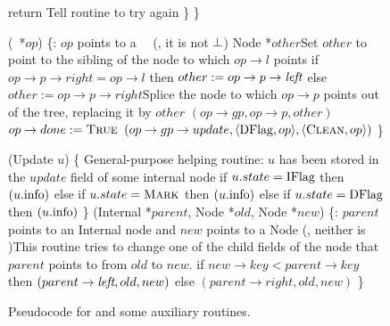 \begin{figure*}
\begin{code}
		return \FALSE\tabtabcom Tell  routine to try again\nlc
		\p       \}\nlc
		\p
		\}\bl
		\nlc
		
		(\DFlag\ *$op$) \{\ul
		\n   {}:  $op$ points to a \DFlag\ \record\  (\ie, it is not $\mbox{$\bot$}$)\nlc
		Node *$other$\bl\ul
		\com Set $other$ to point to the sibling of the node to which  $op\rightarrow l$ points \nlc
		if $op\rightarrow p\rightarrow right = op\rightarrow l$ then $other := op\rightarrow p \rightarrow \mbox{\it left}$ else $other:=op\rightarrow p\rightarrow right$\label{read-other}\ul 
		\com Splice the node to which $op\rightarrow p$ points out of the tree, replacing it by $other$\nlc
		$(op\rightarrow gp, op\rightarrow p, other)$ \label{dchild-cas}\nlc
		\textcolor{blue}{$op \rightarrow done := \mbox{\sc True}$}  \nlc
		\CASB$(op\rightarrow gp\rightarrow update, \langle \mbox{DFlag}, op\rangle, \langle \mbox{\sc Clean}, op\rangle)$ \label{dunflag-cas}\nlc
		\p
		\}\bl\nlc
		
		(Update $u$) \{ \tabtabcom General-purpose helping routine\ul
		\n    {}:  $u$ has been stored in the $update$ field of some internal node\nlc
		if $u.state = \mbox{IFlag}$ then $(u.\mbox{info})$\label{call-HelpInsert}\nlc
		else if $u.state = \mbox{\sc Mark}$ then $(u.\mbox{info})$\label{call-hm2}\nlc
		else if $u.state = \mbox{DFlag}$ then $(u.\mbox{info})$\label{call-HelpDelete}\nlc
		\p
		\}\bl
		\nlc
		(Internal *$parent$, Node *$old$, Node *$new$) \{\label{CAS-Child}\ul
		\n  {}:  $parent$ points to an Internal node and $new$ points to a Node (\ie, neither is \NULL)\ul
		\com This routine tries to change one of the child fields of the node that $parent$ points to from $old$ to $new$.\nlc
		if $new \rightarrow key < parent\rightarrow key$ then\label{which-child}\nlc
		\n       \CASB$(parent\rightarrow \mbox{\it left}, old, new)$\label{child-cas-1}\nlc
		\p  else\nlc
		\n       \CASB$(parent\rightarrow right, old, new)$\label{child-cas-2}\nlc
		\p\p 
		\}
	\end{code}
	\caption{\label{code3}Pseudocode for  and some auxiliary routines.}
\end{figure*}